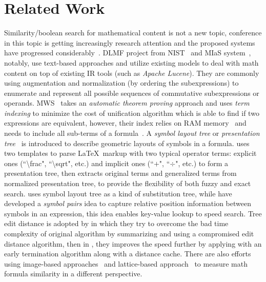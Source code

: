 \documentclass{acm_proc_article-sp}
\begin{document}
\pagebreak
\section{Related Work}
Similarity/boolean search for mathematical content is not a new topic,
conference in this topic is getting increasingly research attention and the proposed systems have progressed considerably~\cite{ov}.
DLMF project from NIST~\cite{Youssef03,Youssef05} and MIaS system~\cite{mias11a,mias11,mias:thesis}, notably, use text-based approaches and utilize existing models to deal with math content on top of existing IR tools (such as \textit{Apache Lucene}). 
They are commonly using augmentation and normalization (by ordering the subexpressions) to enumerate and represent all possible sequences of commutative subexpressions or operands.
MWS~\cite{Kohlhase06,Kohlhase0p5} takes an \textit{automatic theorem proving} approach and uses \textit{term indexing} to minimize the cost of unification algorithm which is able to find if two expressions are equivalent, 
however, their index relies on RAM memory~\cite{Kohlhase0p5} and needs to include all sub-terms of a formula~\cite{Kohlhase06}.
A \textit{symbol layout tree} or \textit{presentation tree}~\cite{symbollayout12,WikiMirs13} is introduced to describe geometric layouts of symbols in a formula. 
\cite{WikiMirs13} uses two templates to parse \LaTeX\ markup with two typical operator terms: explicit ones (``\textbackslash frac", ``\textbackslash sqrt", etc.) and implicit ones (``$+$", ``$\div$", etc.) to form a presentation tree,
then extracts original terms and generalized terms from normalized presentation tree, to provide the flexibility of both fuzzy and exact search.
\cite{symbollayout12} uses symbol layout tree as a kind of substitution tree, while \cite{symbolpairs15,symbolpair15:2} have developed a \textit{symbol pairs} idea to capture relative position information between symbols in an expression,
this idea enables key-value lookup to speed search.
Tree edit distance is adopted by \cite{editdisXML11} in which they try to overcome the bad time complexity of original algorithm by summarizing and using a compromised edit distance algorithm, 
then in \cite{editdisXML13}, they improves the speed further by applying with an early termination algorithm along with a distance cache.
There are also efforts using image-based approaches~\cite{imageb11,handwrite} and lattice-based approach~\cite{lattice} to measure math formula similarity in a different perspective.
\end{document}
